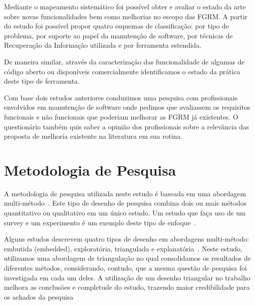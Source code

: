 Mediante o mapeamento sistemático foi possível obter e avaliar o estado da arte
sobre novas funcionalidades bem como melhorias no escopo das FGRM\@. A partir do
estudo foi possível propor quatro esquemas de classificação: por tipo de
problema, por suporte ao papel da manutenção de software, por técnicas de
Recuperação da Informação utilizada e por ferramenta estendida.

De maneira similar, através da caracterização das funcionalidade de algumas de
código aberto ou disponíveis comercialmente identificamos o estado da prática
deste tipo de ferramenta.

Com base dois estudos anteriores conduzimos uma pesquisa com
profissionais envolvidos em manutenção de software onde pedimos que avaliassem
os requisitos funcionais e não funcionais que poderiam melhorar as FGRM já
existentes. O questionário também quis saber a opinião dos profissionais sobre a
relevância das proposta de melhoria existente na literatura em sua
rotina.

\section{Metodologia de Pesquisa}
\label{sec:intro-metodologia}

A metodologia de pesquisa utilizada neste estudo é baseada em uma abordagem
multi-método~\cite{hesse2010mixed}. Este tipo de desenho de pesquisa combina
dois ou mais métodos quantitativo ou qualitativo em um único estudo. Um estudo
que faça uso de um survey e um experimento é um exemplo deste tipo de
enfoque~\cite{hesse2010mixed}.

Alguns estudos descrevem quatro tipos de desenho em abordagens multi-método:
embutida (embedded), exploratória, triangulada e
explanatória~\cite{creswell2007designing}. Neste estudo, utilizamos uma
abordagem de triangulação no qual consolidamos os resultados de diferentes
métodos, considerando, contudo, que a mesma questão de pesquisa foi investigada
em cada um deles. A utilização de um desenho triangular no trabalho melhora as
conclusões e completude do estudo, trazendo maior credibilidade para os achados
da pesquisa~\cite{hesse2010mixed}

